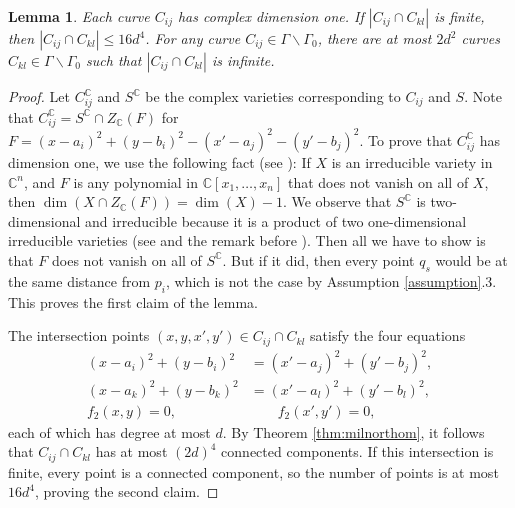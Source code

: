 \documentclass[12pt]{article}
\newtheorem{lemma}[theorem]{Lemma}
\newcommand{\CC}{\mathbb C}
\begin{document}

\begin{lemma}\label{lem:intersect}
 Each curve $C_{ij}$ has complex dimension one.
 If $|C_{ij}\cap C_{kl}|$ is finite, 
 then $|C_{ij}\cap C_{kl}| \leq 16 d^4$.
 For any curve $C_{ij}\in \Gamma\backslash \Gamma_0$, 
 there are at most $2d^2$ curves $C_{kl}\in \Gamma\backslash \Gamma_0$
 such that $|C_{ij}\cap C_{kl}|$ is infinite. 
\end{lemma}
\begin{proof}
 Let $C_{ij}^{\CC}$ and $S^{\CC}$ be the complex varieties corresponding to $C_{ij}$ and $S$.
 Note that $C_{ij}^\CC =S^{\CC}\cap Z_{\CC}(F)$
 for $F = (x-a_i)^2 + (y-b_i)^2 - (x'-a_j)^2 - (y'-b_j)^2$.
 To prove that $C_{ij}^{\CC}$ has dimension one, 
 we use the following fact (see \cite[Exercise 11.6]{harris:algebraic}): 
 If $X$ is an irreducible variety in $\CC^n$, 
 and $F$ is any polynomial in $\CC[x_1,\ldots, x_n]$ 
 that does not vanish on all of $X$, 
 then $\dim(X\cap Z_{\CC}(F)) =\dim(X) -1$.
 We observe that $S^{\CC}$ is two-dimensional and irreducible because 
 it is a product of two one-dimensional irreducible varieties
 (see \cite[Exercise 5.9]{harris:algebraic} and the remark before \cite[Theorem 11.12]{harris:algebraic}).
 Then all we have to show is that $F$ does not vanish on all of $S^{\CC}$.
 But if it did, then every point $q_s$ would be at the same distance from $p_i$,
 which is not the case by Assumption \ref{assumption}.3.
 This proves the first claim of the lemma.

 The intersection points $(x,y,x',y')\in C_{ij}\cap C_{kl}$ satisfy the four equations
 \begin{align*}
  (x-a_i)^2 + (y-b_i)^2 &= (x'-a_j)^2 + (y'-b_j)^2,\\
  (x-a_k)^2 + (y-b_k)^2 &= (x'-a_l)^2 + (y'-b_l)^2,\\
  f_2(x,y)=0,~~~~~~&~~~~~~~~~f_2(x',y')=0,
 \end{align*}
each of which has degree at most $d$. 
 By Theorem \ref{thm:milnorthom}, it follows that $C_{ij}\cap C_{kl}$ has
 at most $(2d)^4$ connected components.
 If this intersection is finite, every point is a connected component,
 so the number of points is at most $16d^4$, proving the second claim.
 

\end{proof}
\end{document}
